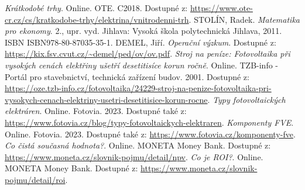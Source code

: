\begin{thebibliography}{9}
    \textit{Krátkodobé trhy}. Online. OTE. C2018. Dostupné z: \url{https://www.ote-cr.cz/cs/kratkodobe-trhy/elektrina/vnitrodenni-trh}.
    STOLÍN, Radek. \textit{Matematika pro ekonomy}. 2., upr. vyd. Jihlava: Vysoká škola polytechnická Jihlava, 2011. ISBN ISBN978-80-87035-35-1.
    DEMEL, Jiří. \textit{Operační výzkum}. Dostupné z: \url{https://kix.fsv.cvut.cz/~demel/ped/ov/ov.pdf}.
    \textit{Stroj na peníze: Fotovoltaika při vysokých cenách elektřiny ušetří desetitisíce korun ročně}. Online. TZB-info - Portál pro stavebnictví, technická zařízení budov. 2001. Dostupné z: \url{https://oze.tzb-info.cz/fotovoltaika/24229-stroj-na-penize-fotovoltaika-pri-vysokych-cenach-elektriny-usetri-desetitisice-korun-rocne}.
    \textit{Typy fotovoltaických elektráren}. Online. Fotovia. 2023. Dostupné také z: \url{https://www.fotovia.cz/blog/typy-fotovoltaickych-elektraren}.
    \textit{Komponenty FVE}. Online. Fotovia. 2023. Dostupné také z: \url{https://www.fotovia.cz/komponenty-fve}.
    \textit{Co čistá současná hodnota?}. Online. MONETA Money Bank. Dostupné z: \url{https://www.moneta.cz/slovnik-pojmu/detail/npv}.
    \textit{Co je ROI?}. Online. MONETA Money Bank. Dostupné z: \url{https://www.moneta.cz/slovnik-pojmu/detail/roi}.
\end{thebibliography}